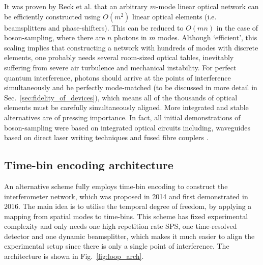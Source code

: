 \documentclass[aps,rmp,twocolumn,amsmath,amssymb,nofootinbib,superscriptaddress]{revtex4}
\begin{document}
It was proven by Reck et al. \cite{bib:18} that an arbitrary $m$-mode linear optical network can be efficiently constructed using $O(m^2)$ linear optical elements (i.e. beamsplitters and phase-shifters). This can be reduced to $O(mn)$ in the case of boson-sampling, where there are $n$ photons in $m$ modes. Although `efficient', this scaling implies that constructing a network with hundreds of modes with discrete elements, one probably needs several room-sized optical tables, inevitably suffering from severe air turbulence and mechanical instability. For perfect quantum interference, photons should arrive at the points of interference simultaneously and be perfectly mode-matched (to be discussed in more detail in Sec.~\ref{sec:fidelity_of_devices}), which means all of the thousands of optical elements must be carefully simultaneously aligned. More integrated and stable alternatives are of pressing importance. In fact, all initial demonstrations of boson-sampling were based on integrated optical circuits including, waveguides based on direct laser writing techniques \cite{bib:4, bib:5, bib:6} and fused fibre couplers \cite{bib:10}.

\subsection{Time-bin encoding architecture}

An alternative scheme fully employs time-bin encoding to construct the interferometer network, which was proposed \cite{bib:19} in 2014 and first demonstrated \cite{bib:11} in 2016. The main idea is to utilise the temporal degree of freedom, by applying a mapping from spatial modes to time-bins. This scheme has fixed experimental complexity and only needs one high repetition rate SPS, one time-resolved detector and one dynamic beamsplitter, which makes it much easier to align the experimental setup since there is only a single point of interference. The architecture is shown in Fig.~\ref{fig:loop_arch}.
\end{document}
